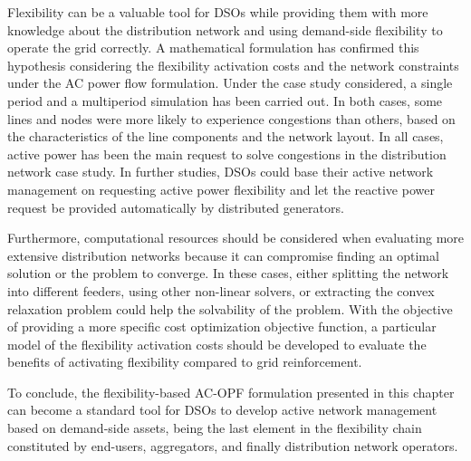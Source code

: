 Flexibility can be a valuable tool for DSOs while providing them with more knowledge about the distribution network and using demand-side flexibility to operate the grid correctly. A mathematical formulation has confirmed this hypothesis considering the flexibility activation costs and the network constraints under the AC power flow formulation. Under the case study considered, a single period and a multiperiod simulation has been carried out. In both cases, some lines and nodes were more likely to experience congestions than others, based on the characteristics of the line components and the network layout. In all cases, active power has been the main request to solve congestions in the distribution network case study. In further studies, DSOs could base their active network management on requesting active power flexibility and let the reactive power request be provided automatically by distributed generators.  

Furthermore, computational resources should be considered when evaluating more extensive distribution networks because it can compromise finding an optimal solution or the problem to converge. In these cases, either splitting the network into different feeders, using other non-linear solvers, or extracting the convex relaxation problem could help the solvability of the problem. With the objective of providing a more specific cost optimization objective function, a particular model of the flexibility activation costs should be developed to evaluate the benefits of activating flexibility compared to grid reinforcement. 

To conclude, the flexibility-based AC-OPF formulation presented in this chapter can become a standard tool for DSOs to develop active network management based on demand-side assets, being the last element in the flexibility chain constituted by end-users, aggregators, and finally distribution network operators. 